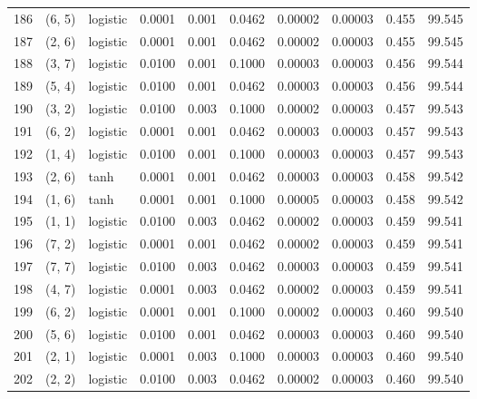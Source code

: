 \begin{tabular}{lllrrrrrrr}
186 &      (6, 5) &  logistic &  0.0001 &  0.001 &  0.0462 &          0.00002 &    0.00003 &       0.455 &    99.545 \\
187 &      (2, 6) &  logistic &  0.0001 &  0.001 &  0.0462 &          0.00002 &    0.00003 &       0.455 &    99.545 \\
188 &      (3, 7) &  logistic &  0.0100 &  0.001 &  0.1000 &          0.00003 &    0.00003 &       0.456 &    99.544 \\
189 &      (5, 4) &  logistic &  0.0100 &  0.001 &  0.0462 &          0.00003 &    0.00003 &       0.456 &    99.544 \\
190 &      (3, 2) &  logistic &  0.0100 &  0.003 &  0.1000 &          0.00002 &    0.00003 &       0.457 &    99.543 \\
191 &      (6, 2) &  logistic &  0.0001 &  0.001 &  0.0462 &          0.00003 &    0.00003 &       0.457 &    99.543 \\
192 &      (1, 4) &  logistic &  0.0100 &  0.001 &  0.1000 &          0.00003 &    0.00003 &       0.457 &    99.543 \\
193 &      (2, 6) &      tanh &  0.0001 &  0.001 &  0.0462 &          0.00003 &    0.00003 &       0.458 &    99.542 \\
194 &      (1, 6) &      tanh &  0.0001 &  0.001 &  0.1000 &          0.00005 &    0.00003 &       0.458 &    99.542 \\
195 &      (1, 1) &  logistic &  0.0100 &  0.003 &  0.0462 &          0.00002 &    0.00003 &       0.459 &    99.541 \\
196 &      (7, 2) &  logistic &  0.0001 &  0.001 &  0.0462 &          0.00002 &    0.00003 &       0.459 &    99.541 \\
197 &      (7, 7) &  logistic &  0.0100 &  0.003 &  0.0462 &          0.00003 &    0.00003 &       0.459 &    99.541 \\
198 &      (4, 7) &  logistic &  0.0001 &  0.003 &  0.0462 &          0.00002 &    0.00003 &       0.459 &    99.541 \\
199 &      (6, 2) &  logistic &  0.0001 &  0.001 &  0.1000 &          0.00002 &    0.00003 &       0.460 &    99.540 \\
200 &      (5, 6) &  logistic &  0.0100 &  0.001 &  0.0462 &          0.00003 &    0.00003 &       0.460 &    99.540 \\
201 &      (2, 1) &  logistic &  0.0001 &  0.003 &  0.1000 &          0.00003 &    0.00003 &       0.460 &    99.540 \\
202 &      (2, 2) &  logistic &  0.0100 &  0.003 &  0.0462 &          0.00002 &    0.00003 &       0.460 &    99.540 \\

\end{tabular}

